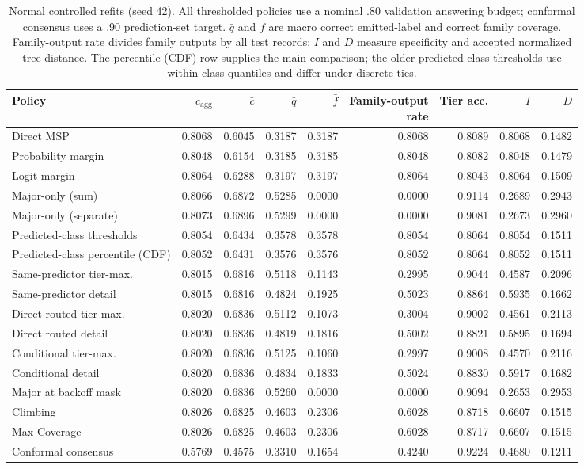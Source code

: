 \begin{table}[htbp]
\centering\footnotesize
\setlength{\tabcolsep}{2.5pt}
\caption{Normal controlled refits (seed 42). All thresholded policies use a nominal .80 validation answering budget; conformal consensus uses a .90 prediction-set target. $\bar q$ and $\bar f$ are macro correct emitted-label and correct family coverage. Family-output rate divides family outputs by all test records; $I$ and $D$ measure specificity and accepted normalized tree distance. The percentile (CDF) row supplies the main comparison; the older predicted-class thresholds use within-class quantiles and differ under discrete ties.}\label{tab:supp-controls-normal}
\begin{tabular}{lrrrrrrrr}
\toprule
Policy & $c_{\mathrm{agg}}$ & $\bar c$ & $\bar q$ & $\bar f$ & \shortstack{Family-output\\rate} & Tier acc. & $I$ & $D$ \\
\midrule
Direct MSP & 0.8068 & 0.6045 & 0.3187 & 0.3187 & 0.8068 & 0.8089 & 0.8068 & 0.1482 \\
Probability margin & 0.8048 & 0.6154 & 0.3185 & 0.3185 & 0.8048 & 0.8082 & 0.8048 & 0.1479 \\
Logit margin & 0.8064 & 0.6288 & 0.3197 & 0.3197 & 0.8064 & 0.8043 & 0.8064 & 0.1509 \\
Major-only (sum) & 0.8066 & 0.6872 & 0.5285 & 0.0000 & 0.0000 & 0.9114 & 0.2689 & 0.2943 \\
Major-only (separate) & 0.8073 & 0.6896 & 0.5299 & 0.0000 & 0.0000 & 0.9081 & 0.2673 & 0.2960 \\
Predicted-class thresholds & 0.8054 & 0.6434 & 0.3578 & 0.3578 & 0.8054 & 0.8064 & 0.8054 & 0.1511 \\
Predicted-class percentile (CDF) & 0.8052 & 0.6431 & 0.3576 & 0.3576 & 0.8052 & 0.8064 & 0.8052 & 0.1511 \\
Same-predictor tier-max. & 0.8015 & 0.6816 & 0.5118 & 0.1143 & 0.2995 & 0.9044 & 0.4587 & 0.2096 \\
Same-predictor detail & 0.8015 & 0.6816 & 0.4824 & 0.1925 & 0.5023 & 0.8864 & 0.5935 & 0.1662 \\
Direct routed tier-max. & 0.8020 & 0.6836 & 0.5112 & 0.1073 & 0.3004 & 0.9002 & 0.4561 & 0.2113 \\
Direct routed detail & 0.8020 & 0.6836 & 0.4819 & 0.1816 & 0.5002 & 0.8821 & 0.5895 & 0.1694 \\
Conditional tier-max. & 0.8020 & 0.6836 & 0.5125 & 0.1060 & 0.2997 & 0.9008 & 0.4570 & 0.2116 \\
Conditional detail & 0.8020 & 0.6836 & 0.4834 & 0.1833 & 0.5024 & 0.8830 & 0.5917 & 0.1682 \\
Major at backoff mask & 0.8020 & 0.6836 & 0.5260 & 0.0000 & 0.0000 & 0.9094 & 0.2653 & 0.2953 \\
Climbing & 0.8026 & 0.6825 & 0.4603 & 0.2306 & 0.6028 & 0.8718 & 0.6607 & 0.1515 \\
Max-Coverage & 0.8026 & 0.6825 & 0.4603 & 0.2306 & 0.6028 & 0.8717 & 0.6607 & 0.1515 \\
Conformal consensus & 0.5769 & 0.4575 & 0.3310 & 0.1654 & 0.4240 & 0.9224 & 0.4680 & 0.1211 \\
\bottomrule
\end{tabular}
\end{table}
